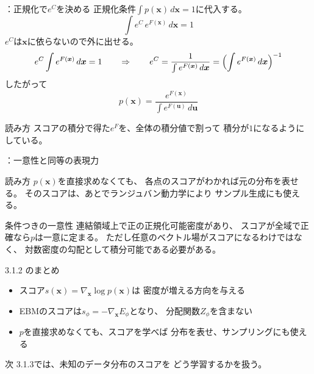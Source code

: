 \begin{frame}{\supplmark：正規化で$e^{C}$を決める}
    正規化条件$\displaystyle\int p(\bm{x})\,d\bm{x}=1$に代入する。
    \[
        \int e^{C}\,e^{F(\bm{x})}\,d\bm{x}=1
    \]
    $e^{C}$は$\bm{x}$に依らないので外に出せる。
    \[
        e^{C}\int e^{F(\bm{x})}\,d\bm{x}=1
        \qquad\Rightarrow\qquad
        e^{C}
        =
        \frac{1}{\int e^{F(\bm{x})}\,d\bm{x}}
        =
        \Bigl(\int e^{F(\bm{x})}\,d\bm{x}\Bigr)^{-1}
    \]
    したがって
    \[
        p(\bm{x})
        =
        \frac{e^{F(\bm{x})}}{\int e^{F(\bm{u})}\,d\bm{u}}
    \]
    \begin{exampleblock}{読み方}
        スコアの積分で得た$e^{F}$を、全体の積分値で割って
        積分が$1$になるようにしている。
    \end{exampleblock}
\end{frame}
\assuppl
\begin{frame}{\supplmark：一意性と同等の表現力}
    \begin{exampleblock}{読み方}
        $p(\bm{x})$を直接求めなくても、
        各点のスコアがわかれば元の分布を表せる。
        そのスコアは、あとでランジュバン動力学により
        サンプル生成にも使える。
    \end{exampleblock}
    \begin{exampleblock}{条件つきの一意性}
        連結領域上で正の正規化可能密度があり、
        スコアが全域で正確なら$p$は一意に定まる。
        ただし任意のベクトル場がスコアになるわけではなく、
        対数密度の勾配として積分可能である必要がある。
    \end{exampleblock}
\end{frame}
\asmain
\begin{frame}{3.1.2 のまとめ}
    \begin{itemize}
        \item スコア$s(\bm{x})=\nabla_{\bm{x}}\log p(\bm{x})$は
        密度が増える方向を与える
        \item EBMのスコアは$s_\phi=-\nabla_{\bm{x}}E_\phi$となり、
        分配関数$Z_\phi$を含まない
        \item $p$を直接求めなくても、スコアを学べば
        分布を表せ、サンプリングにも使える
    \end{itemize}
    \begin{block}{次}
        3.1.3では、未知のデータ分布のスコアを
        どう学習するかを扱う。
    \end{block}
\end{frame}
